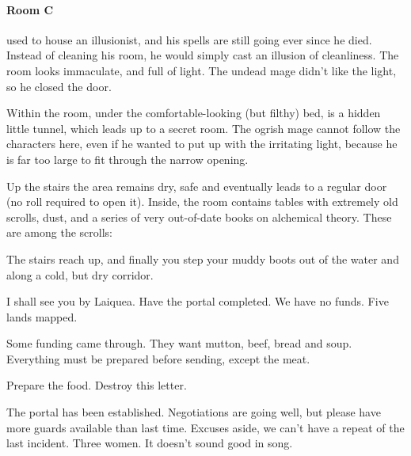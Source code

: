 \begin{multicols}{2}
\paragraph{Room C} used to house an illusionist, and his spells are still going ever since he died.  Instead of cleaning his room, he would simply cast an illusion of cleanliness.  The room looks immaculate, and full of light.  The undead mage didn't like the light, so he closed the door.

Within the room, under the comfortable-looking (but filthy) bed, is a hidden little tunnel, which leads up to a secret room.
The ogrish mage cannot follow the characters here, even if he wanted to put up with the irritating light, because he is far too large to fit through the narrow opening.


Up the stairs the area remains dry, safe and eventually leads to a regular door (no roll required to open it).  Inside, the room contains tables with extremely old scrolls, dust, and a series of very out-of-date books on alchemical theory.  These are among the scrolls:

\begin{boxtext}

  The stairs reach up, and finally you step your muddy boots out of the water and along a cold, but dry corridor.

\end{boxtext}

\begin{exampletext}

  I shall see you by Laiquea.  Have the portal completed.  We have no funds.  Five lands mapped.

\end{exampletext}

\begin{exampletext}

  Some funding came through.  They want mutton, beef, bread and soup.  Everything must be prepared before sending, except the meat.

  Prepare the food.  Destroy this letter.

\end{exampletext}

\begin{exampletext}

  The portal has been established.  Negotiations are going well, but please have more guards available than last time.  Excuses aside, we can't have a repeat of the last incident.  Three women.  It doesn't sound good in song.


\end{exampletext}
\end{multicols}
